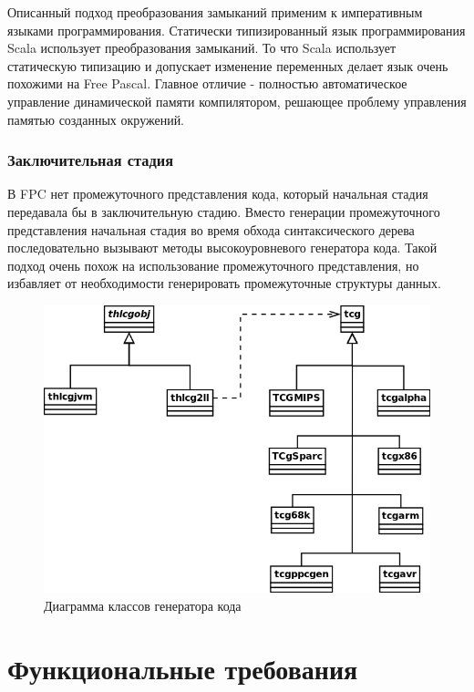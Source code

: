 \documentclass{imcs}
\begin{document}
Описанный подход преобразования замыканий применим к императивным языками
программирования. Статически типизированный язык программирования Scala
использует преобразования замыканий\cite{scalaoverview}\cite{scalaclosure}. То что
Scala использует статическую типизацию и допускает изменение переменных делает
язык очень похожими на Free Pascal. Главное отличие - полностью автоматическое
управление динамической памяти компилятором, решающее проблему управления памятью
созданных окружений.

\subsubsection{Заключительная стадия}

В FPC нет промежуточного представления кода, который начальная стадия
передавала бы в заключительную стадию. Вместо генерации промежуточного представления
начальная стадия во время обхода синтаксического дерева последовательно вызывают методы
высокоуровневого генератора кода. Такой подход очень похож на использование
промежуточного представления, но избавляет от необходимости генерировать промежуточные
структуры данных.

\begin{figure}[htb]
\centering
\includegraphics[width=\textwidth]{./uml/cgen.png}
\caption{Диаграмма классов генератора кода}
\end{figure}

\pagebreak

\section{Функциональные требования}
\end{document}
